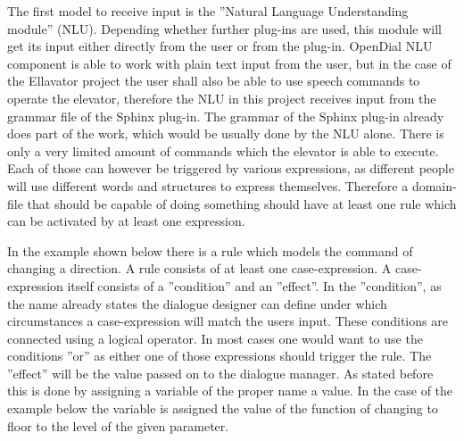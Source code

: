 \documentclass[a4paper, 12pt]{article}
\begin{document}
The first model to receive input is the ”Natural Language Understanding module” (NLU). 
Depending whether further plug-ins are used, this module will get its input either directly from the user or from the plug-in.
OpenDial NLU component is able to work with plain text input from the user, but in the case of the Ellavator project the user shall also be able to use speech commands to operate the elevator, therefore the NLU in this project receives input from the grammar file of the Sphinx plug-in.
The grammar of the Sphinx plug-in already does part of the work, which would be usually done by the NLU alone.
There is only a very limited amount of commands which the elevator is able to execute.
Each of those can however be triggered by various expressions, as different people will use different words and structures to express themselves.
Therefore a domain-file that should be capable of doing something should have at least one rule which can be activated by at least one expression. \newline


In the example shown below there is a rule which models the command of changing a direction.
A rule consists of at least one case-expression.
A case-expression itself consists of a ”condition” and an ”effect”.
 In the ”condition”, as the name already states the dialogue designer can define under which circumstances a case-expression will match the users input.
 These conditions are connected using a logical operator.
 In most cases one would want to use the conditions ”or” as either one of those expressions should trigger the rule.
 The ”effect” will be the value passed on to the dialogue manager.  
 As stated before this is done by assigning a variable of the proper name a value.
 In the case of the example below the variable is assigned the value of the function of changing to floor to the level of the given parameter. 
\end{document}
